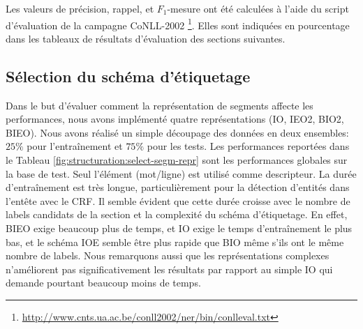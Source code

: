 Les valeurs de précision, rappel, et $F_1$-mesure ont été calculées à l'aide du script d'évaluation de la campagne CoNLL-2002 \footnote{\url{http://www.cnts.ua.ac.be/conll2002/ner/bin/conlleval.txt}}. Elles sont indiquées en pourcentage dans les tableaux de résultats d'évaluation des sections suivantes.

\subsection{Sélection du schéma d'étiquetage}
Dans le but d'évaluer comment la représentation de segments affecte les performances, nous avons implémenté quatre représentations (IO, IEO2, BIO2, BIEO).  Nous avons réalisé un simple découpage des données en deux ensembles: $25 \%$ pour l'entraînement et $75 \%$ pour les tests. Les performances reportées dans le Tableau \ref{fig:structuration:select-segm-repr} sont les performances globales sur la base de test. Seul l'élément (mot/ligne) est utilisé comme descripteur. La durée d'entraînement est très longue, particulièrement pour la détection d'entités dans l'entête avec le CRF. Il semble évident que cette durée croisse avec le nombre de labels candidats de la section et la complexité du schéma d'étiquetage. En effet, BIEO exige beaucoup plus de temps, et IO exige le temps d'entraînement le plus bas, et le schéma IOE semble être plus rapide que BIO même s'ils ont le même nombre de labels. Nous remarquons aussi que les représentations complexes n'améliorent pas significativement les résultats par rapport au simple IO qui demande pourtant beaucoup moins de temps.

